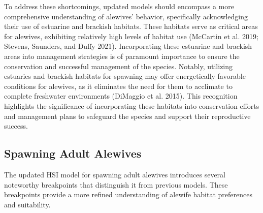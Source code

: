 \documentclass[
]{book}
\begin{document}
To address these shortcomings, updated models should encompass a more comprehensive understanding of alewives' behavior, specifically acknowledging their use of estuarine and brackish habitats.
These habitats serve as critical areas for alewives, exhibiting relatively high levels of habitat use (McCartin et al. 2019; Stevens, Saunders, and Duffy 2021).
Incorporating these estuarine and brackish areas into management strategies is of paramount importance to ensure the conservation and successful management of the species.
Notably, utilizing estuaries and brackish habitats for spawning may offer energetically favorable conditions for alewives, as it eliminates the need for them to acclimate to complete freshwater environments (DiMaggio et al. 2015).
This recognition highlights the significance of incorporating these habitats into conservation efforts and management plans to safeguard the species and support their reproductive success.

\hypertarget{spawning-adult-alewives-1}{%
\subsection{Spawning Adult Alewives}\label{spawning-adult-alewives-1}}

The updated HSI model for spawning adult alewives introduces several noteworthy breakpoints that distinguish it from previous models.
These breakpoints provide a more refined understanding of alewife habitat preferences and suitability.
\end{document}
